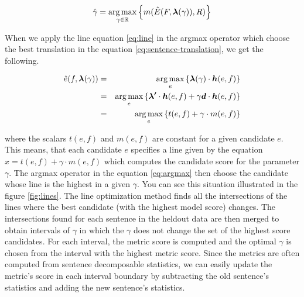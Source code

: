 \begin{equation}
  \hat{\gamma} = \operatorname*{arg\,max}_{\gamma \in \mathbb{R}} \left\{ m(\hat{E}(F,\boldsymbol{\lambda}(\gamma)),R) \right\}
    \label{eq:line-opt}
\end{equation}

When we apply the line equation \ref{eq:line} in the argmax operator which
choose the best translation in the equation \ref{eq:sentence-translation}, we
get the following.

\begin{eqnarray}
  \hat{e}(f, \boldsymbol{\lambda}(\gamma))
    & = & \operatorname*{arg\,max}_{e} \left\{ \boldsymbol{\lambda}(\gamma) \cdot  \boldsymbol{h}(e, f) \right\} \\
    & = & \operatorname*{arg\,max}_{e} \left\{ \boldsymbol{\lambda'} \cdot \boldsymbol{h}(e, f) + \gamma \boldsymbol{d} \cdot \boldsymbol{h}(e, f) \right\} \\
    & = & \operatorname*{arg\,max}_{e} \left\{ t(e,f) + \gamma \cdot m(e,f) \right\} \label{eq:argmax}
\end{eqnarray}

\noindent where the scalars $t(e,f)$ and $m(e,f)$ are constant for a given
candidate $e$. This means, that each candidate $e$ specifies a line given by
the equation $x = t(e,f) + \gamma \cdot m(e,f)$ which computes the candidate
score for the parameter $\gamma$. The argmax operator in the equation
\eqref{eq:argmax} then choose the candidate whose line is the highest in a
given $\gamma$. You can see this situation illustrated in the figure
\ref{fig:lines}.  The line optimization method finds all the intersections of
the lines where the best candidate (with the highest model score) changes. The
intersections found for each sentence in the heldout data are then merged to
obtain intervals of $\gamma$ in which the $\gamma$ does not change the set of
the highest score candidates.  For each interval, the metric score is computed
and the optimal $\gamma$ is chosen from the interval with the highest metric
score. Since the metrics are often computed from sentence decomposable
statistics, we can easily update the metric's score in each interval boundary
by subtracting the old sentence's statistics and adding the new sentence's
statistics.

